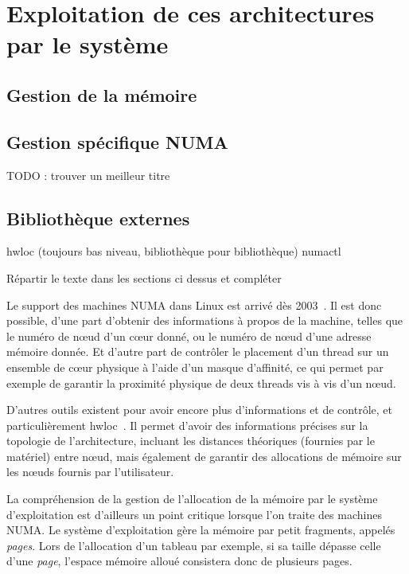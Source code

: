 \section{Exploitation de ces architectures par le système}\label{sec:context:os}

\subsection{Gestion de la mémoire}

\subsection{Gestion spécifique NUMA}
TODO : trouver un meilleur titre

\subsection{Bibliothèque externes}

hwloc (toujours bas niveau, bibliothèque pour bibliothèque)
numactl

\begin{todo}
  Répartir le texte dans les sections ci dessus et compléter
\end{todo}

Le support des machines NUMA dans Linux est arrivé dès 2003~\cite{Dobson2003}.
Il est donc possible, d'une part d'obtenir des informations à propos de la machine, telles que le numéro de nœud d'un cœur donné, ou le numéro de nœud d'une adresse mémoire donnée.
Et d'autre part de contrôler le placement d'un thread sur un ensemble de cœur physique à l'aide d'un masque d'affinité, ce qui permet par exemple de garantir la proximité physique de deux threads vis à vis d'un nœud.

D'autres outils existent pour avoir encore plus d'informations et de contrôle, et particulièrement hwloc~\cite{Broquedis2010}.
Il permet d'avoir des informations précises sur la topologie de l'architecture, incluant les distances théoriques (fournies par le matériel) entre nœud, mais également de garantir des allocations de mémoire sur les nœuds fournis par l'utilisateur.

La compréhension de la gestion de l'allocation de la mémoire par le système d'exploitation est d'ailleurs un point critique lorsque l'on traite des machines NUMA.
Le système d'exploitation gère la mémoire par petit fragments, appelés \emph{pages}.
Lors de l'allocation d'un tableau par exemple, si sa taille dépasse celle d'une \emph{page}, l'espace mémoire alloué consistera donc de plusieurs pages.

